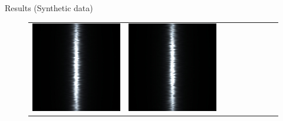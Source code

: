 \documentclass[final]{beamer}
\newlength{\twocolwid}
\newlength{\resultwidth}
\begin{document}
\begin{frame}[t]
\begin{columns}[t]
\begin{column}{\twocolwid}
\begin{block}{Results (Synthetic data)}
\begin{figure}[t]
\begin{tabular}{ccrclcccc}
            		\includegraphics[width=\resultwidth]{synth/metal/good1.jpg} &
            		\includegraphics[width=\resultwidth]{synth/metal/good2.jpg} &

\end{tabular}
\end{figure}
\end{block}
\end{column}
\end{columns}
\end{frame}
\end{document}
